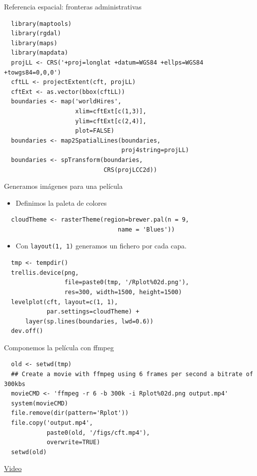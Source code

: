 \documentclass[xcolor={usenames,svgnames,dvipsnames}]{beamer}
\begin{document}
\begin{frame}[fragile,label=sec-4-5-2]{Referencia espacial: fronteras administrativas}
 \lstset{language=R,label= ,caption= ,numbers=none}
\begin{lstlisting}
  library(maptools)
  library(rgdal)
  library(maps)
  library(mapdata)
  projLL <- CRS('+proj=longlat +datum=WGS84 +ellps=WGS84 +towgs84=0,0,0')
  cftLL <- projectExtent(cft, projLL)
  cftExt <- as.vector(bbox(cftLL))
  boundaries <- map('worldHires',
                    xlim=cftExt[c(1,3)],
                    ylim=cftExt[c(2,4)],
                    plot=FALSE)
  boundaries <- map2SpatialLines(boundaries,
                                 proj4string=projLL)
  boundaries <- spTransform(boundaries,
                            CRS(projLCC2d))
\end{lstlisting}
\end{frame}


\begin{frame}[fragile,label=sec-4-5-3]{Generamos imágenes para una película}
 \begin{itemize}
\item Definimos la paleta de colores
\end{itemize}
\lstset{language=R,label= ,caption= ,numbers=none}
\begin{lstlisting}
  cloudTheme <- rasterTheme(region=brewer.pal(n = 9,
                                name = 'Blues'))
\end{lstlisting}

\begin{itemize}
\item Con \texttt{layout(1, 1)} generamos un fichero por cada capa.
\end{itemize}
\lstset{language=R,label= ,caption= ,numbers=none}
\begin{lstlisting}
  tmp <- tempdir()
  trellis.device(png,
                 file=paste0(tmp, '/Rplot%02d.png'),
                 res=300, width=1500, height=1500)
  levelplot(cft, layout=c(1, 1),
            par.settings=cloudTheme) +
      layer(sp.lines(boundaries, lwd=0.6))
  dev.off()
\end{lstlisting}
\end{frame}

\begin{frame}[fragile,label=sec-4-5-4]{Componemos la película con ffmpeg}
 \lstset{language=R,label= ,caption= ,numbers=none}
\begin{lstlisting}
  old <- setwd(tmp)
  ## Create a movie with ffmpeg using 6 frames per second a bitrate of 300kbs
  movieCMD <- 'ffmpeg -r 6 -b 300k -i Rplot%02d.png output.mp4'
  system(movieCMD)
  file.remove(dir(pattern='Rplot'))
  file.copy('output.mp4',
            paste0(old, '/figs/cft.mp4'),
            overwrite=TRUE)
  setwd(old)
\end{lstlisting}

\begin{block}{}
\href{http://vimeo.com/user18057623/cft}{Video}
\end{block}
\end{frame}
\end{document}
